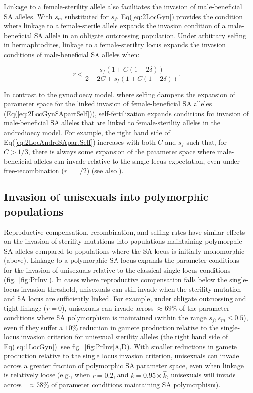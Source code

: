 \documentclass{article}
\begin{document}
Linkage to a female-sterility allele also facilitates the invasion of male-beneficial SA alleles. With $s_m$ substituted for $s_f$, Eq(\ref{eq:2LocGyn}) provides the condition where linkage to a female-sterile allele expands the invasion condition of a male-beneficial SA allele in an obligate outcrossing population. Under arbitrary selfing in hermaphrodites, linkage to a female-sterility locus expands the invasion conditions of male-beneficial SA alleles when:

\begin{equation}\label{eq:2LocAndroSApartSelf}
	r < \frac{s_f(1 + C (1 - 2 \delta))}{2 - 2 C + s_f(1 + C (1 - 2 \delta))}.
\end{equation}

\noindent In contrast to the gynodioecy model, where selfing dampens the expansion of parameter space for the linked invasion of female-beneficial SA alleles (Eq(\ref{eq:2LocGynSApartSelf})), self-fertilization expands conditions for invasion of male-beneficial SA alleles that are linked to female-sterility alleles in the androdioecy model. For example, the right hand side of Eq(\ref{eq:2LocAndroSApartSelf}) increases with both $C$ and $s_f$ such that, for $C > 1/3$, there is always some expansion of the parameter space where male-beneficial alleles can invade relative to the single-locus expectation, even under free-recombination ($r = 1/2$) (see also \citealt{Olito2017}).



\subsection*{Invasion of unisexuals into polymorphic populations}

Reproductive compensation, recombination, and selfing rates have similar effects on the invasion of sterility mutations into populations maintaining polymorphic SA alleles compared to populations where the SA locus is initially monomorphic (above). Linkage to a polymorphic SA locus expands the parameter conditions for the invasion of unisexuals relative to the classical single-locus conditions (fig.~\ref{fig:PrInv}). In cases where reproductive compensation falls below the single-locus invasion threshold, unisexuals can still invade when the sterility mutation and SA locus are sufficiently linked. For example, under obligate outcrossing and tight linkage ($r = 0$), unisexuals can invade across $\approx 69\%$ of the parameter conditions where SA polymorphism is maintained (within the range $s_f,s_m \leq 0.5$), even if they suffer a  $10\%$ reduction in gamete production relative to the single-locus invasion criterion for unisexual sterility alleles (the right hand side of Eq(\ref{eq:1LocGyn}); see fig.~\ref{fig:PrInv}A,D). With smaller reductions in gamete production relative to the single locus invasion criterion, unisexuals can invade across a greater fraction of polymorphic SA parameter space, even when linkage is relatively loose (e.g.,  when $r = 0.2$, and $k = 0.95 \times \hat{k}$, unisexuals will invade across ~$\approx 38\%$ of parameter conditions maintaining SA polymorphism). 
\end{document}
